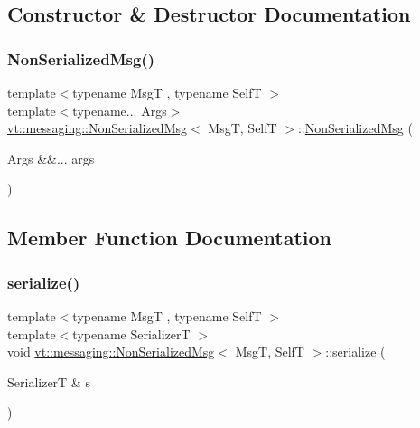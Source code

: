 \subsection{Constructor \& Destructor Documentation}
\mbox{\label{structvt_1_1messaging_1_1_non_serialized_msg_aaaf8f519b382fdad6f9fab8191a2950f}} 
\subsubsection{\texorpdfstring{Non\+Serialized\+Msg()}{NonSerializedMsg()}}
{\footnotesize\ttfamily template$<$typename MsgT , typename SelfT $>$ \\
template$<$typename... Args$>$ \\
\hyperlink{structvt_1_1messaging_1_1_non_serialized_msg}{vt\+::messaging\+::\+Non\+Serialized\+Msg}$<$ MsgT, SelfT $>$\+::\hyperlink{structvt_1_1messaging_1_1_non_serialized_msg}{Non\+Serialized\+Msg} (\begin{DoxyParamCaption}\item[{Args \&\&...}]{args }\end{DoxyParamCaption})\hspace{0.3cm}{\ttfamily [inline]}}



\subsection{Member Function Documentation}
\mbox{\label{structvt_1_1messaging_1_1_non_serialized_msg_a2598724a040d6b6f1a343d4f2def910d}} 
\subsubsection{\texorpdfstring{serialize()}{serialize()}}
{\footnotesize\ttfamily template$<$typename MsgT , typename SelfT $>$ \\
template$<$typename SerializerT $>$ \\
void \hyperlink{structvt_1_1messaging_1_1_non_serialized_msg}{vt\+::messaging\+::\+Non\+Serialized\+Msg}$<$ MsgT, SelfT $>$\+::serialize (\begin{DoxyParamCaption}\item[{SerializerT \&}]{s }\end{DoxyParamCaption})\hspace{0.3cm}{\ttfamily [delete]}}



